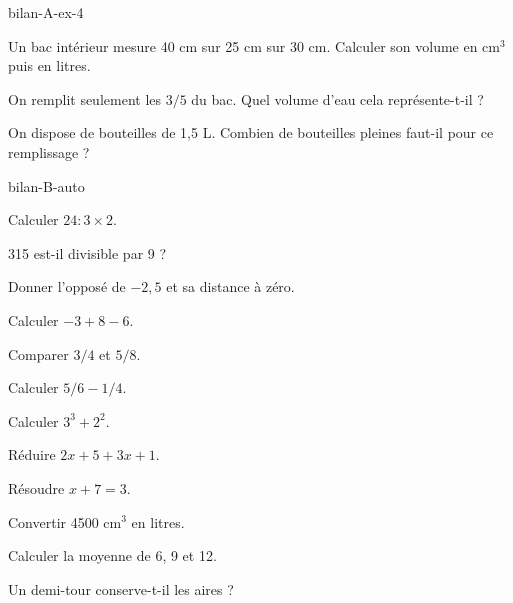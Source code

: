 \begin{blocEdition}{bilan-A-ex-4}
\begin{questions}
\item Un bac intérieur mesure 40 cm sur 25 cm sur 30 cm. Calculer son volume en cm$^3$ puis en litres.
\item On remplit seulement les $3/5$ du bac. Quel volume d’eau cela représente-t-il ?
\item On dispose de bouteilles de 1,5 L. Combien de bouteilles pleines faut-il pour ce remplissage ?
\end{questions}\label{fig-bilan-A-ex-4}
\par{}\par\par{}\par{}\par{}\par{}\par{}\par{}
\end{blocEdition}
\begin{blocEdition}{bilan-B-auto}
\begin{questions}
\item Calculer $24:3\times2$.
\item 315 est-il divisible par 9 ?
\item Donner l’opposé de $-2{,}5$ et sa distance à zéro.
\item Calculer $-3+8-6$.
\item Comparer $3/4$ et $5/8$.
\item Calculer $5/6-1/4$.
\item Calculer $3^3+2^2$.
\item Réduire $2x+5+3x+1$.
\item Résoudre $x+7=3$.
\item Convertir 4500 cm$^3$ en litres.
\item Calculer la moyenne de 6, 9 et 12.
\item Un demi-tour conserve-t-il les aires ?\end{questions}
\end{blocEdition}
